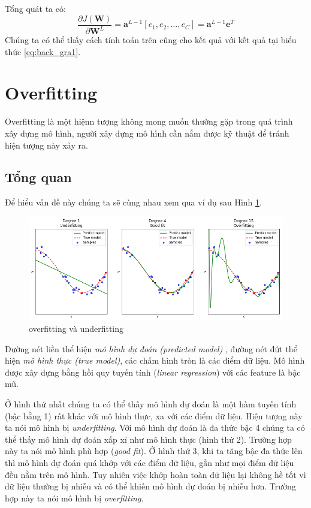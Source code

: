Tổng quát ta có:
\begin{equation}
\frac{\partial J(\textbf{W})}{\partial \textbf{W}^{L}} = \textbf{a}^{L-1}[e_1,e_2,\ldots,e_C]=\textbf{a}^{L-1}\textbf{e}^{T}
\end{equation}
Chúng ta có thể thấy cách tính toán trên cũng cho kết quả với kết quả tại biểu thức \ref{eq:back_gra1}.
\section{Overfitting}
Overfitting là một hiệnn tượng không mong muốn thường gặp trong quá trình xây dựng mô hình, người xây dựng mô hình cần nắm được kỹ thuật để tránh hiện tượng này xảy ra.
\subsection{Tổng quan}
Để hiểu vấn đề này chúng ta sẽ cùng nhau xem qua ví dụ sau  Hình \ref{fig:overfitting}.
\begin{center}
 	\begin{figure}[H]
    \begin{center}
    \includegraphics[scale=0.5]{chap3/image/overfitting.png}
    \end{center}
    \caption{overfitting và underfitting}
    \label{fig:overfitting}
    \end{figure}
\end{center}
Đường nét liền thể hiện \textit{mô hình dự đoán (predicted model)} , đường nét đứt thể hiện \textit{mô hình thực (true model)}, các chấm hình tròn là các điểm dữ liệu. Mô hình được xây dựng bằng hồi quy tuyến tính (\textit{linear regression}) với các feature là bậc mũ.\par
Ở hình thứ nhất chúng ta có thể thấy mô hình dự đoán là một hàm tuyến tính (bậc bằng 1) rất khác với mô hình thực, xa với các điểm dữ liệu. Hiện tượng này ta nói mô hình bị \textit{underfitting}.
Với mô hình dự đoán là đa thức bậc 4 chúng ta có thể thấy mô hình dự đoán xấp xỉ như mô hình thực (hình thứ 2). Trường hợp này ta nói mô hình phù hợp (\textit{good fit}). Ở hình thứ 3, khi ta tăng bậc đa thức lên thì mô hình dự đoán quá khớp với các điểm dữ liệu, gần như mọi điểm dữ liệu đều nằm trên mô hình. Tuy nhiên việc khớp hoàn toàn dữ liệu lại không hề tốt vì dữ liệu thường bị nhiễu và có thể khiến mô hình dự đoán bị nhiễu hơn. Trường hợp này ta nói mô hình bị\textit{ overfitting}.\\
